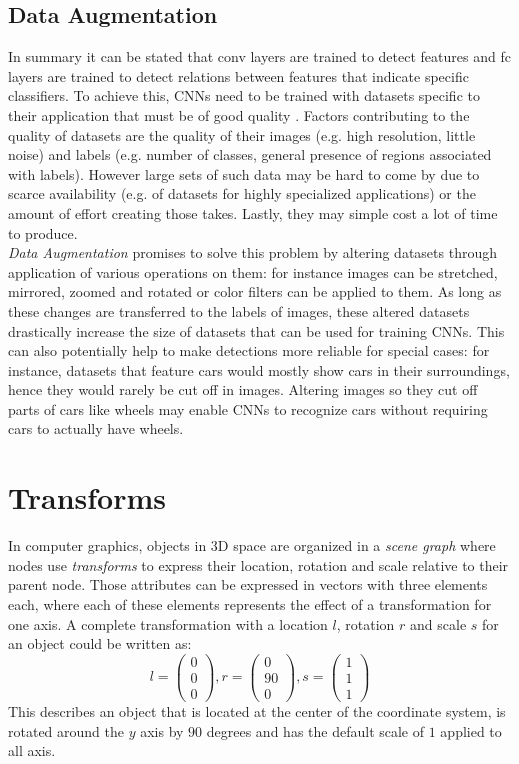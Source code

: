 \subsection{Data Augmentation}
In summary it can be stated that \ac{conv} layers are trained to detect features and \ac{fc} layers are trained to detect relations between features that indicate specific classifiers. To achieve this, \acp{CNN} need to be trained with datasets specific to their application that must be of good quality \cite{Schweitzer2017}. Factors contributing to the quality of datasets are the quality of their images (e.g. high resolution, little noise) and labels (e.g. number of classes, general presence of regions associated with labels). However large sets of such data may be hard to come by due to scarce availability (e.g. of datasets for highly specialized applications) or the amount of effort creating those takes. Lastly, they may simple cost a lot of time to produce.\\
\emph{Data Augmentation} promises to solve this problem by altering datasets through application of various operations on them: for instance images can be stretched, mirrored, zoomed and rotated or color filters can be applied to them. As long as these changes are transferred to the labels of images, these altered datasets drastically increase the size of datasets that can be used for training \acp{CNN}. This can also potentially help to make detections more reliable for special cases: for instance, datasets that feature cars would mostly show cars in their surroundings, hence they would rarely be cut off in images. Altering images so they cut off parts of cars like wheels may enable \acp{CNN} to recognize cars without requiring cars to actually have wheels.
\clearpage

\section{Transforms}
\label{ch03-transforms}
In computer graphics, objects in 3D space are organized in a \emph{scene graph} where nodes use \emph{transforms} to express their location, rotation and scale relative to their parent node. Those attributes can be expressed in vectors with three elements each, where each of these elements represents the effect of a transformation for one axis. A complete transformation with a location $l$, rotation $r$ and scale $s$ for an object could be written as:
\begin{equation}
    l = \begin{pmatrix} 0\\0\\0\end{pmatrix}, r = \begin{pmatrix} 0\\90\\0\end{pmatrix},  s = \begin{pmatrix} 1\\1\\1\end{pmatrix}
\end{equation}
This describes an object that is located at the center of the coordinate system, is rotated around the $y$ axis by $90$ degrees and has the default scale of $1$ applied to all axis.
